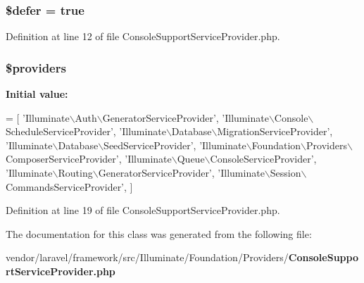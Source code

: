 \subsubsection[{\$defer}]{\setlength{\rightskip}{0pt plus 5cm}\$defer = true\hspace{0.3cm}{\ttfamily [protected]}}\label{class_illuminate_1_1_foundation_1_1_providers_1_1_console_support_service_provider_af035ee3a0e66d50f2a013040b1d320b8}


Definition at line 12 of file Console\+Support\+Service\+Provider.\+php.

\subsubsection[{\$providers}]{\setlength{\rightskip}{0pt plus 5cm}\$providers\hspace{0.3cm}{\ttfamily [protected]}}\label{class_illuminate_1_1_foundation_1_1_providers_1_1_console_support_service_provider_a8619fb6079fbd79202034b45724fd6ca}
{\bfseries Initial value\+:}
\begin{DoxyCode}
= [
        \textcolor{stringliteral}{'Illuminate\(\backslash\)Auth\(\backslash\)GeneratorServiceProvider'},
        \textcolor{stringliteral}{'Illuminate\(\backslash\)Console\(\backslash\)ScheduleServiceProvider'},
        \textcolor{stringliteral}{'Illuminate\(\backslash\)Database\(\backslash\)MigrationServiceProvider'},
        \textcolor{stringliteral}{'Illuminate\(\backslash\)Database\(\backslash\)SeedServiceProvider'},
        \textcolor{stringliteral}{'Illuminate\(\backslash\)Foundation\(\backslash\)Providers\(\backslash\)ComposerServiceProvider'},
        \textcolor{stringliteral}{'Illuminate\(\backslash\)Queue\(\backslash\)ConsoleServiceProvider'},
        \textcolor{stringliteral}{'Illuminate\(\backslash\)Routing\(\backslash\)GeneratorServiceProvider'},
        \textcolor{stringliteral}{'Illuminate\(\backslash\)Session\(\backslash\)CommandsServiceProvider'},
    ]
\end{DoxyCode}


Definition at line 19 of file Console\+Support\+Service\+Provider.\+php.



The documentation for this class was generated from the following file\+:\begin{DoxyCompactItemize}
\item 
vendor/laravel/framework/src/\+Illuminate/\+Foundation/\+Providers/{\bf Console\+Support\+Service\+Provider.\+php}\end{DoxyCompactItemize}

